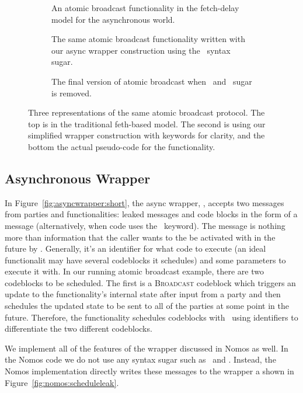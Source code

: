 \begin{figure}
\begin{subfigure}{\columnwidth}
    
    \caption{An atomic broadcast functionality in the fetch-delay model for the asynchronous world.}
    \label{fig:atomic:old}
\end{subfigure}
\begin{subfigure}{\columnwidth}
    
    \caption{The same atomic broadcast functionality written with our async wrapper construction using the \Eventually~syntax sugar.}
    \label{fig:atomic:new}
\end{subfigure}
\begin{subfigure}{\columnwidth}
    
    \caption{The final version of atomic broadcast when \Leak~and \Eventually~sugar is removed.}
    \label{fig:atomic:real}
\end{subfigure}
\caption{Three representations of the same atomic broadcast protocol. The top is in the traditional feth-based model. The second is using our simplified wrapper construction with keywords for clarity, and the bottom the actual pseudo-code for the functionality.}
\label{fig:fatomic}
\end{figure}

\subsection{Asynchronous Wrapper}
In Figure~\ref{fig:asyncwrapper:short}, the async wrapper, \Wasync, accepts two messages from parties and functionalities: leaked messages and code blocks in the form of a  message (alternatively, when code uses the \Eventually~keyword).
The  message is nothing more than information that the caller wants to the be activated with in the future by \Wasync.
Generally, it's an identifier for what code to execute (an ideal functionalit may have several codeblocks it schedules) and some parameters to execute it with.
In our running atomic broadcast example, there are two codeblocks to be scheduled.
The first is a \textsc{Broadcast} codeblock which triggers an update to the functionality's internal state after input from a party and then schedules the updated state to be sent to all of the parties at some point in the future.
Therefore, the functionality schedules codeblocks with \Wasync~using identifiers to differentiate the two different codeblocks.

We implement all of the features of the wrapper discussed in Nomos as well.
In the Nomos code we do not use any syntax sugar such as \Eventually~and \Leak.
Instead, the Nomos implementation directly writes these messages to the wrapper a shown in Figure~\ref{fig:nomos:scheduleleak}.

